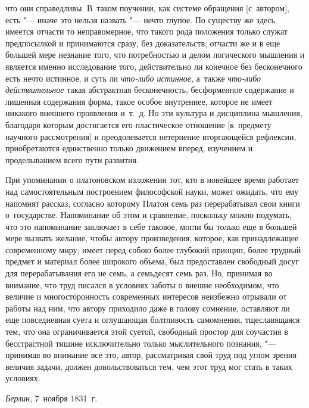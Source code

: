что они справедливы. В~таком поучении, как системе обращения [с~автором], есть
"--- иначе это нельзя назвать "--- нечто глупое. По существу же здесь имеется
отчасти то неправомерное, что такого рода положения только служат предпосылкой
и принимаются сразу, без доказательств; отчасти же и в еще большей мере
незнание того, что потребностью и делом логического мышления и является именно
исследование того, действительно ли конечное без бесконечного есть нечто
истинное, и суть ли {\em что-либо истинное}, а~также
{\em что-либо действительное} такая абстрактная бесконечность, бесформенное
содержание и лишенная содержания форма, такое особое внутреннее, которое не
имеет никакого внешнего проявления и~т.~д. Но эти культура и дисциплина
мышления, благодаря которым достигается его пластическое отношение [к~предмету
научного рассмотрения] и преодолевается нетерпение вторгающейся рефлексии,
приобретаются единственно только движением вперед, изучением и проделыванием
всего пути развития.

При упоминании о платоновском изложении тот, кто в новейшее время работает над
самостоятельным построением философской науки, может ожидать, что ему напомнят
рассказ, согласно которому Платон семь раз перерабатывал свои книги
о~государстве. Напоминание об этом и сравнение, поскольку можно подумать, что
это напоминание заключает в себе таковое, могли бы только еще в большей мере
вызвать желание, чтобы автору произведения, которое, как принадлежащее
современному миру, имеет перед собою более глубокий принцип, более трудный
предмет и материал более широкого объема, был предоставлен свободный досуг для
перерабатывания его не семь, а семьдесят семь раз. Но, принимая во внимание,
что труд писался в условиях заботы о внешне необходимом, что величие и
многосторонность современных интересов неизбежно отрывали от работы над ним,
что автору приходило даже в голову сомнение, оставляют ли еще повседневная
суета и оглушающая болтливость самомнения, тщеславящаяся тем, что она
ограничивается этой суетой, свободный простор для соучастия в бесстрастной
тишине исключительно только мыслительного познания, "--- принимая во внимание
все это, автор, рассматривая свой труд под углом зрения величия задачи, должен
довольствоваться тем, чем этот труд мог стать в таких условиях.

{\em Берлин}, 7~ноября 1831~г.

\bigskip
